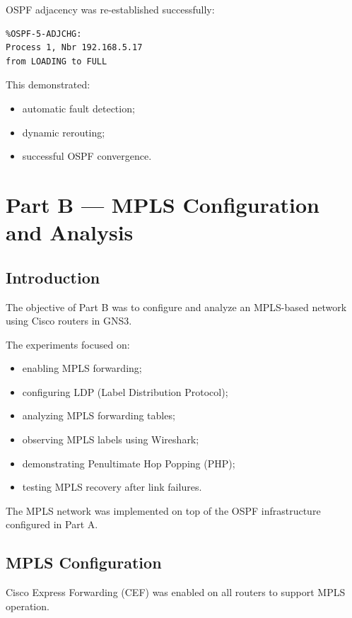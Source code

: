 \documentclass[12pt]{article}
\begin{document}
OSPF adjacency was re-established successfully:

\begin{lstlisting}
%OSPF-5-ADJCHG:
Process 1, Nbr 192.168.5.17
from LOADING to FULL
\end{lstlisting}

This demonstrated:
\begin{itemize}
    \item automatic fault detection;
    \item dynamic rerouting;
    \item successful OSPF convergence.
\end{itemize}

\newpage

\section{Part B — MPLS Configuration and Analysis}

\subsection{Introduction}

The objective of Part B was to configure and analyze an MPLS-based network using Cisco routers in GNS3.

The experiments focused on:
\begin{itemize}
    \item enabling MPLS forwarding;
    \item configuring LDP (Label Distribution Protocol);
    \item analyzing MPLS forwarding tables;
    \item observing MPLS labels using Wireshark;
    \item demonstrating Penultimate Hop Popping (PHP);
    \item testing MPLS recovery after link failures.
\end{itemize}

The MPLS network was implemented on top of the OSPF infrastructure configured in Part A.

\subsection{MPLS Configuration}

Cisco Express Forwarding (CEF) was enabled on all routers to support MPLS operation.
\end{document}
